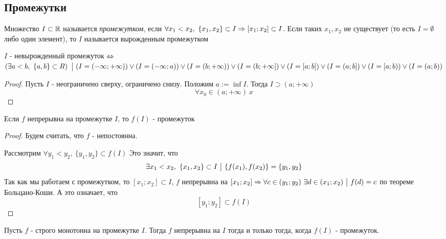 \subsection{Промежутки}

\begin{definition}
	Множество $I \subset \mathbb{R}$ называется \textit{промежутком}, если $\forall x_1 < x_2,\ \{x_1, x_2\} \subset I \Rightarrow [x_1; x_2] \subset I$. Если таких $x_1, x_2$ не существует (то есть $I = \emptyset$ либо один элемент), то $I$ называется вырожденным промежутком
\end{definition}

\begin{lemma}
	$I$ - невырожденный промежуток $\Leftrightarrow$ $\left(\exists a < b,\ \{a, b\} \subset R\right) \ \big|\  (I = (-\infty; +\infty)) \vee (I = (-\infty; a)) \vee (I = (b; +\infty)) \vee (I = (b; +\infty]) \vee (I = [a; b]) \vee (I = (a; b]) \vee (I = [a; b)) \vee (I = (a; b))$
\end{lemma}

\begin{proof}
	Пусть $I$ - неограничено сверху, ограничено снизу. Положим $a := \inf I$. Тогда $I \supset (a; +\infty)$
	$$
		\forall x_0 \in (a; +\infty)\ x
	$$
\end{proof}

\begin{lemma}
	Если $f$ непрерывна на промежутке $I$, то $f(I)$ - промежуток
\end{lemma}

\begin{proof}
	Будем считать, что $f$ - непостоянна.
	
	Рассмотрим $\forall y_1 < y_2,\ \{y_1, y_2\} \subset f(I)$
	Это значит, что
	$$
		\exists x_1 < x_2,\ \{x_1, x_2\} \subset I \such \{f(x_1), f(x_2)\} = \{y_1, y_2\}
	$$
	Так как мы работаем с промежутком, то $[x_1; x_2] \subset I$, $f$ непрерывна на $[x_1; x_2] \Rightarrow \forall c \in (y_1; y_2)\ \exists d \in (x_1; x_2) \ \big|\  f(d) = c$ по теореме Больцано-Коши. А это означает, что
	$$
		[y_1; y_2] \subset f(I)
	$$
\end{proof}

\begin{lemma}
	Пусть $f$ - строго монотонна на промежутке $I$. Тогда $f$ непрерывна на $I$ тогда и только тогда, когда $f(I)$ - промежуток.
\end{lemma}

